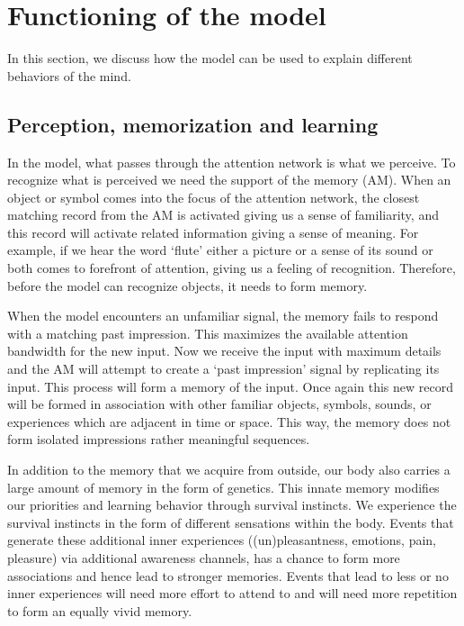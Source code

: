 \documentclass[reprint,amsmath,amssymb,apr,aip,onecolumn, 11pt]{revtex4-1}
\begin{document}
		

\section{Functioning of the model}
In this section, we discuss how the model can be used to explain different behaviors of the mind. 



\subsection{Perception, memorization and learning}

In the model, what passes through the attention network is what we perceive. To recognize what is perceived we need the support of the memory (AM). When an object or symbol comes into the focus of the attention network, the closest matching record from the AM is activated giving us a sense of familiarity, and this record will activate related information giving a sense of meaning. For example, if we hear the word `flute' either a picture or a sense of its sound or both comes to forefront of attention, giving us a feeling of recognition. Therefore, before the model can recognize objects, it needs to form memory. 

When the model encounters an unfamiliar signal, the memory fails to respond with a matching past impression. This maximizes the available attention bandwidth for the new input. Now we receive the input with maximum details and the AM will attempt to create a `past impression' signal by replicating its input. This process will form a memory of the input. Once again this new record will be formed in association with other familiar objects, symbols, sounds, or experiences which are adjacent in time or space. This way, the memory does not form isolated impressions rather meaningful sequences. 

In addition to the memory that we acquire from outside, our body also carries a large amount of memory in the form of genetics. This innate memory modifies our priorities and learning behavior through survival instincts. We experience the survival instincts in the form of different sensations within the body. Events that generate these additional inner experiences ((un)pleasantness, emotions, pain, pleasure) via additional awareness channels, has a chance to form more associations and hence lead to stronger memories.  Events that lead to less or no inner experiences will need more effort to attend to and will need more repetition to form an equally vivid memory.
\end{document}

